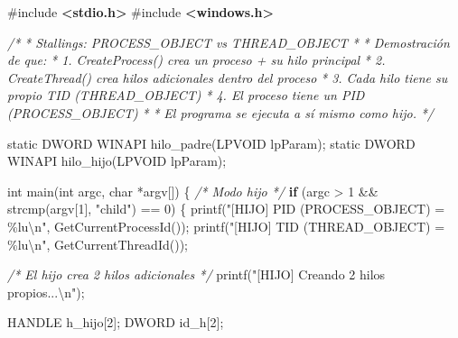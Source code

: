 \documentclass[
  spanish,
]{article}
\newenvironment{Shaded}{}{}
\newcommand{\CommentTok}[1]{\textcolor[rgb]{0.38,0.63,0.69}{\textit{#1}}}
\newcommand{\ControlFlowTok}[1]{\textcolor[rgb]{0.00,0.44,0.13}{\textbf{#1}}}
\newcommand{\DataTypeTok}[1]{\textcolor[rgb]{0.56,0.13,0.00}{#1}}
\newcommand{\DecValTok}[1]{\textcolor[rgb]{0.25,0.63,0.44}{#1}}
\newcommand{\ImportTok}[1]{\textcolor[rgb]{0.00,0.50,0.00}{\textbf{#1}}}
\newcommand{\NormalTok}[1]{#1}
\newcommand{\OperatorTok}[1]{\textcolor[rgb]{0.40,0.40,0.40}{#1}}
\newcommand{\PreprocessorTok}[1]{\textcolor[rgb]{0.74,0.48,0.00}{#1}}
\newcommand{\SpecialCharTok}[1]{\textcolor[rgb]{0.25,0.44,0.63}{#1}}
\newcommand{\StringTok}[1]{\textcolor[rgb]{0.25,0.44,0.63}{#1}}
\begin{document}
\begin{Shaded}
\begin{Highlighting}[]
\PreprocessorTok{\#include }\ImportTok{\textless{}stdio.h\textgreater{}}
\PreprocessorTok{\#include }\ImportTok{\textless{}windows.h\textgreater{}}

\CommentTok{/*}
\CommentTok{ * Stallings: PROCESS\_OBJECT vs THREAD\_OBJECT}
\CommentTok{ *}
\CommentTok{ * Demostración de que:}
\CommentTok{ * 1. CreateProcess() crea un proceso + su hilo principal}
\CommentTok{ * 2. CreateThread() crea hilos adicionales dentro del proceso}
\CommentTok{ * 3. Cada hilo tiene su propio TID (THREAD\_OBJECT)}
\CommentTok{ * 4. El proceso tiene un PID (PROCESS\_OBJECT)}
\CommentTok{ *}
\CommentTok{ * El programa se ejecuta a sí mismo como hijo.}
\CommentTok{ */}

\DataTypeTok{static}\NormalTok{ DWORD WINAPI hilo\_padre}\OperatorTok{(}\NormalTok{LPVOID lpParam}\OperatorTok{);}
\DataTypeTok{static}\NormalTok{ DWORD WINAPI hilo\_hijo}\OperatorTok{(}\NormalTok{LPVOID lpParam}\OperatorTok{);}

\DataTypeTok{int}\NormalTok{ main}\OperatorTok{(}\DataTypeTok{int}\NormalTok{ argc}\OperatorTok{,} \DataTypeTok{char} \OperatorTok{*}\NormalTok{argv}\OperatorTok{[])} \OperatorTok{\{}
    \CommentTok{/* Modo hijo */}
    \ControlFlowTok{if} \OperatorTok{(}\NormalTok{argc }\OperatorTok{\textgreater{}} \DecValTok{1} \OperatorTok{\&\&}\NormalTok{ strcmp}\OperatorTok{(}\NormalTok{argv}\OperatorTok{[}\DecValTok{1}\OperatorTok{],} \StringTok{"child"}\OperatorTok{)} \OperatorTok{==} \DecValTok{0}\OperatorTok{)} \OperatorTok{\{}
\NormalTok{        printf}\OperatorTok{(}\StringTok{"[HIJO]  PID (PROCESS\_OBJECT) = }\SpecialCharTok{\%lu\textbackslash{}n}\StringTok{"}\OperatorTok{,}\NormalTok{ GetCurrentProcessId}\OperatorTok{());}
\NormalTok{        printf}\OperatorTok{(}\StringTok{"[HIJO]  TID (THREAD\_OBJECT)  = }\SpecialCharTok{\%lu\textbackslash{}n}\StringTok{"}\OperatorTok{,}\NormalTok{ GetCurrentThreadId}\OperatorTok{());}

        \CommentTok{/* El hijo crea 2 hilos adicionales */}
\NormalTok{        printf}\OperatorTok{(}\StringTok{"[HIJO]  Creando 2 hilos propios...}\SpecialCharTok{\textbackslash{}n}\StringTok{"}\OperatorTok{);}

\NormalTok{        HANDLE h\_hijo}\OperatorTok{[}\DecValTok{2}\OperatorTok{];}
\NormalTok{        DWORD id\_h}\OperatorTok{[}\DecValTok{2}\OperatorTok{];}


\end{Highlighting}
\end{Shaded}
\end{document}
